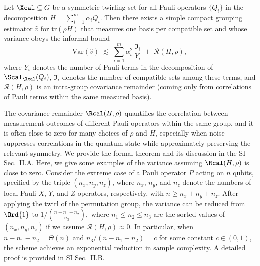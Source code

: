 \documentclass[prl,aps,twocolumn,notitlepage,superscriptaddress,showpacs,nofootinbib]{revtex4-2}
\newcommand{\red}[1]{{\color{red} #1}}
\begin{document}
\begin{theorem}[Informal]
Let $\Xcal \subseteq G$ be a symmetric twirling set for all Pauli operators $\{Q_i\}$ in the decomposition $H=\sum_{i=1}^m \alpha_i Q_i$.  
Then there exists a simple compact grouping estimator $\widehat{v}$ for $\text{tr}(\rho H)$ that measures one basis per compatible set and whose variance obeys the informal bound
\begin{equation}
\mathrm{Var}(\widehat{v})
\;\lesssim\;
\sum_{i=1}^{m}\alpha_i^2\,\frac{\Im_i}{Y_i}\;+\;\mathcal{R}(H,\rho),
\end{equation}
 where $Y_i$ denotes the number of Pauli terms in the decomposition of $\Scal_{\Xcal}(Q_i)$, $\Im_i$ denotes the number of compatible sets among these terms, and $\mathcal{R}(H,\rho)$ is an intra-group covariance remainder (coming only from correlations of Pauli terms within the same measured basis).
\label{thm:main_symmetric_average}
\end{theorem}
The covariance remainder $\Rcal(H,\rho)$ quantifies the correlation between measurement outcomes of different Pauli operators within the same group, and it is often close to zero for many choices of $\rho$ and $H$, especially when noise suppresses correlations in the quantum state while approximately preserving the relevant symmetry.
We provide the formal theorem and its discussion in the \red{SI Sec.~II.A}. 
Here, we give some examples of the variance assuming $\Rcal(H,\rho)$ is close to zero. Consider the extreme case of a Pauli operator $P$ acting on $n$ qubits, specified by the triple $(n_x, n_y, n_z)$, where $n_x$, $n_y$, and $n_z$ denote the numbers of local Pauli-$X$, $Y$, and $Z$ operators, respectively, with $n \ge n_x + n_y + n_z$.
 After applying the twirl of the permutation group, the variance can be reduced from $\Ord{1}$ to ${1}/{{n - n_1 - n_2 \choose n_3}},$
where $n_1 \leq n_2 \leq n_3$ are the sorted values of $(n_x, n_y, n_z)$ if we assume $\mathcal{R}(H,\rho)\approx 0$. 
\red{In particular, when $n-n_1-n_2=\Theta(n)$ and $n_3/(n-n_1-n_2)=c$ for some constant $c\in(0,1)$, the scheme achieves an exponential reduction in sample complexity. A detailed proof is provided in SI Sec.~II.B.
}


\end{document}
